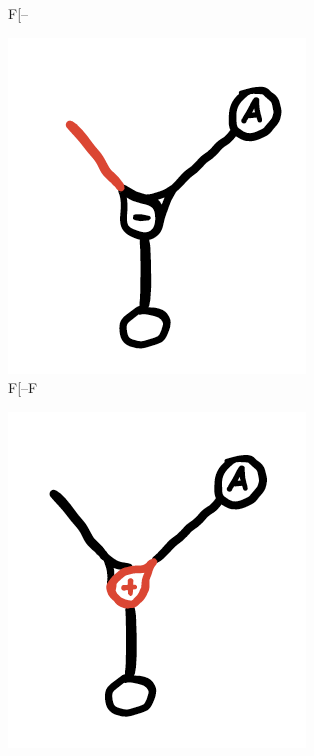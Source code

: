 \documentclass[12pt,twoside]{reedthesis}
\begin{document}
\begin{figure}[H]
\begin{subfigure}{0.3\textwidth}
		\caption{F[–}
	\end{subfigure}
	\hfill
	\begin{subfigure}{0.3\textwidth}
		\centering
		\includegraphics[width=\textwidth, frame]{Images/Diagram7}
		\caption{F[–F}
	\end{subfigure}
	\begin{subfigure}{0.3\textwidth}
		\centering
		\includegraphics[width=\textwidth, frame]{Images/Diagram8}

\end{subfigure}
\end{figure}
\end{document}
